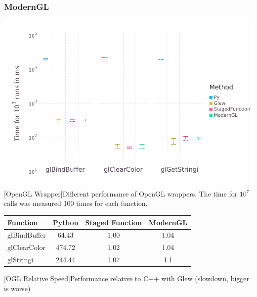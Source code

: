 \subsubsection{ModernGL}
\vspace{1em}
\begin{minipage}{\linewidth}
    \centering
    \includegraphics[width=0.9\linewidth]{graphics/glbench.pdf}
    [OpenGL Wrapper]{Different performance of OpenGL wrappers. The time for $10^7$ calls was measured 100 times for each function.}
    \label{fig:openglwrapper}
\end{minipage}
\begin{table}[htbp]
    \centering
    \begin{tabular}{l|c|c|c}
        \hline
        \textbf{Function}   & \textbf{Python}    & \textbf{Staged Function} & \textbf{ModernGL} \\
        \hline
        glBindBuffer        & 64.43              & 1.00 & 1.04 \\
        glClearColor        & 474.72             & 1.02 & 1.04 \\
        glStringi           & 244.44             & 1.07 & 1.1  \\
    \end{tabular}
    [OGL Relative Speed]{Performance relative to C++ with Glew (slowdown, bigger is worse)}
    \label{table:relativespeedoglw}
\end{table}


